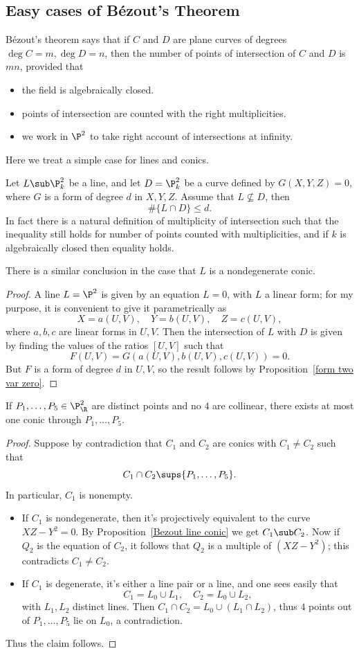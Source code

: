 \subsection{Easy cases of Bézout's Theorem}
Bézout's theorem says that if $C$ and $D$ are plane curves of degrees $\deg C=m,\deg D=n$, then the number of points of intersection of $C$ and $D$ is $mn$, provided that
\begin{itemize}
\item the field is algebraically closed.
\item points of intersection are counted with the right multiplicities.
\item we work in $\P^2$ to take right account of intersections at infinity.
\end{itemize}
Here we treat a simple case for lines and conics.
\begin{theorem}\label{Bezout line conic}
Let $L\sub\P^2_k$ be a line, and let $D=\P^2_k$ be a curve defined by $G(X,Y,Z)=0$, where $G$ is a form of degree $d$ in $X,Y,Z$. Assume that $L\nsubseteq D$, then
\[\#\{L\cap D\}\leq d.\]
In fact there is a natural definition of multiplicity of intersection such that the inequality still holds for number of points counted with multiplicities, and if $k$ is algebraically closed then equality holds.\par
There is a similar conclusion in the case that $L$ is a nondegenerate conic.
\end{theorem}
\begin{proof}
A line $L=\P^2$ is given by an equation $L=0$, with $L$ a linear form; for my purpose, it is convenient to give it parametrically as
\[X=a(U,V),\quad Y=b(U,V),\quad Z=c(U,V),\]
where $a,b,c$ are linear forms in $U,V$. Then the intersection of $L$ with $D$ is given by finding the values of the ratios $[U,V]$ such that
\[F(U,V)=G(a(U,V),b(U,V),c(U,V))=0.\]
But $F$ is a form of degree $d$ in $U,V$, so the result follows by Proposition~\ref{form two var zero}.
\end{proof}
\begin{corollary}\label{conic 5 point}
If $P_1,\dots,P_5\in\P^2_\R$ are distinct points and no $4$ are collinear, there exists at most one conic through $P_1,\dots,P_5$.
\end{corollary}
\begin{proof}
Suppose by contradiction that $C_1$ and $C_2$ are conics with $C_1\neq C_2$ such that
\[C_1\cap C_2\sups\{P_1,\dots,P_5\}.\]
In particular, $C_1$ is nonempty.
\begin{itemize}
\item If $C_1$ is nondegenerate, then it's projectively equivalent to the curve $XZ-Y^2=0$. By Proposition~\ref{Bezout line conic} we get $C_1\sub C_2$. Now if $Q_2$ is the equation of $C_2$, it follows that $Q_2$ is a multiple of $(XZ-Y^2)$; this contradicts $C_1\neq C_2$.
\item If $C_1$ is degenerate, it's either a line pair or a line, and one sees easily that
\[C_1=L_0\cup L_1,\quad C_2=L_0\cup L_2,\]
with $L_1,L_2$ distinct lines. Then $C_1\cap C_2=L_0\cup(L_1\cap L_2)$, thus $4$ points out of $P_1,\dots,P_5$ lie on $L_0$, a contradiction.
\end{itemize}
Thus the claim follows.
\end{proof}
